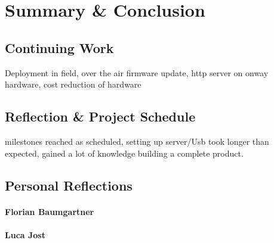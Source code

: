 \chapter{Summary \& Conclusion}

\section{Continuing Work}
Deployment in field, over the air firmware update, http server on onway hardware, cost reduction of hardware

\section{Reflection \& Project Schedule}
milestones reached as scheduled, setting up server/Usb took longer than expected, gained a lot of knowledge building a complete product.  

\section{Personal Reflections}

\subsubsection{Florian Baumgartner}

\subsubsection{Luca Jost}
